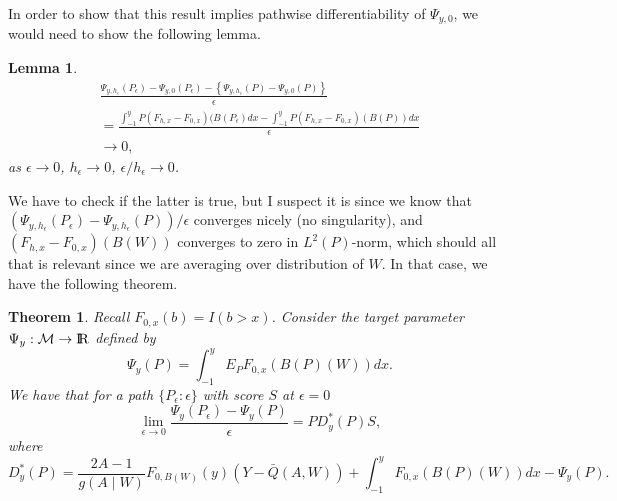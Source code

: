 \documentclass[11pt]{article}
\newtheorem{theorem}{Theorem}
\newtheorem{lemma}{Lemma}
\newcommand{\openr}{\hbox{${\rm I\kern-.2em R}$}}
\begin{document}
In order to show that this result implies pathwise differentiability of $\Psi_{y,0}$, we would need to show the following lemma.
\begin{lemma}
\[
\begin{array}{l}
\displaystyle
\frac{\Psi_{y,h_{\epsilon}}(P_{\epsilon})-\Psi_{y,0}(P_{\epsilon})-\left\{\Psi_{y,h_{\epsilon}}(P)-\Psi_{y,0}(P)\right\}}{\epsilon}
\\
\displaystyle
= \frac{\int_{-1}^y P(F_{h,x}-F_{0,x})(B(P_{\epsilon})dx-\int_{-1}^y P(F_{h,x}-F_{0,x})(B(P)) dx}{\epsilon}\\
\displaystyle  \rightarrow 0,
\end{array}
\]
as $\epsilon\rightarrow 0$, $h_{\epsilon}\rightarrow 0$, $\epsilon/h_{\epsilon}\rightarrow 0$.
\end{lemma}
We have to check if the latter is true, but I suspect it is since we know that $(\Psi_{y,h_{\epsilon}}(P_{\epsilon})-\Psi_{y,h_{\epsilon}}(P))/\epsilon$ converges nicely (no singularity), and $(F_{h,x}-F_{0,x})(B(W))$ converges to zero in $L^2(P)$-norm, which should all that is relevant since we are averaging over distribution of $W$.
In that case, we have the following theorem.
\begin{theorem}
Recall $F_{0,x}(b)=I(b> x)$.
Consider the target parameter $\Psi_{y}:{\cal M}\rightarrow\openr$ defined by
\[
\Psi_{y}(P)=\int_{-1}^y E_P F_{0,x}(B(P)(W)) dx.
\]
We have that for a path $\{P_{\epsilon}:\epsilon\}$ with score $S$ at $\epsilon =0$
\[
\lim_{\epsilon\rightarrow 0}\frac{\Psi_{y}(P_{\epsilon})-\Psi_{y}(P)}{\epsilon}=P D^*_{y}(P)S,\]
where 
\[
D^*_{y}(P)=\frac{2A-1}{g(A\mid W)}F_{0,B(W)}(y)(Y-\bar{Q}(A,W))+\int_{-1}^y F_{0,x}(B(P)(W)) dx -\Psi_{y}(P).\]
\end{theorem}
\end{document}
